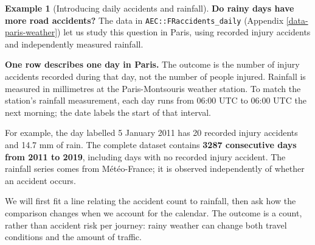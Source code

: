 \documentclass[
  11pt,
]{book}
\theoremstyle{definition}
\theoremstyle{definition}
\newtheorem{example}{Example}[chapter]
\theoremstyle{definition}
\theoremstyle{definition}
\theoremstyle{remark}
\begin{document}

\begin{example}[Introducing daily accidents and rainfall]
\protect\hypertarget{exm:rain-introduction}{}\label{exm:rain-introduction}\textbf{Do rainy days have more road accidents?} The data in \texttt{AEC::FRaccidents\_daily} (Appendix \ref{data-paris-weather}) let us study this question in Paris, using recorded injury accidents and independently measured rainfall.

\textbf{One row describes one day in Paris.} The outcome is the number of injury accidents recorded during that day, not the number of people injured. Rainfall is measured in millimetres at the Paris-Montsouris weather station. To match the station's rainfall measurement, each day runs from 06:00 UTC to 06:00 UTC the next morning; the date labels the start of that interval.

\begin{table}[H]
\centering
\caption{\label{tab:paris-rain-rows}Six consecutive observation days in Paris.}
\centering
{}
\end{table}

For example, the day labelled 5 January 2011 has 20 recorded injury accidents and 14.7 mm of rain. The complete dataset contains \textbf{3287 consecutive days from 2011 to 2019}, including days with no recorded injury accident. The rainfall series comes from Météo-France; it is observed independently of whether an accident occurs.

We will first fit a line relating the accident count to rainfall, then ask how the comparison changes when we account for the calendar. The outcome is a count, rather than accident risk per journey: rainy weather can change both travel conditions and the amount of traffic.
\end{example}
\end{document}
